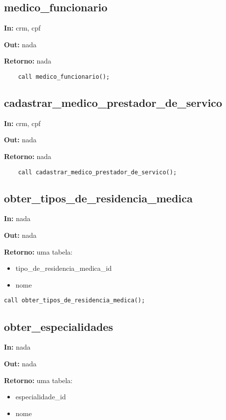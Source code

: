 \subsection{medico\_funcionario}
\textbf{In:} crm, cpf

\textbf{Out:} nada

\textbf{Retorno:} nada

\begin{verbatim}
	call medico_funcionario();
\end{verbatim}

\subsection{cadastrar\_medico\_prestador\_de\_servico}
\textbf{In:} crm, cpf

\textbf{Out:} nada

\textbf{Retorno:} nada

\begin{verbatim}
	call cadastrar_medico_prestador_de_servico();
\end{verbatim}

\subsection{obter\_tipos\_de\_residencia\_medica}

\textbf{In:} nada

\textbf{Out:} nada

\textbf{Retorno:} uma tabela:

\begin{itemize}
	\item tipo\_de\_residencia\_medica\_id
	\item nome
\end{itemize}

\begin{verbatim}
call obter_tipos_de_residencia_medica();
\end{verbatim}

\subsection{obter\_especialidades}

\textbf{In:} nada

\textbf{Out:} nada

\textbf{Retorno:} uma tabela:

\begin{itemize}
	\item especialidade\_id
	\item nome
\end{itemize}

